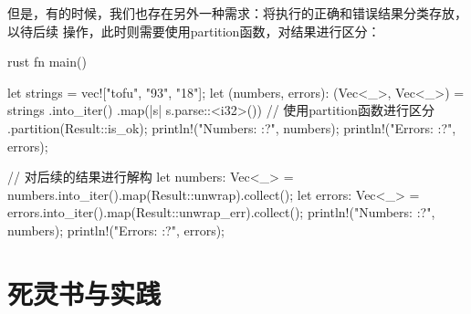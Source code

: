但是，有的时候，我们也存在另外一种需求：将执行的正确和错误结果分类存放，以待后续
操作，此时则需要使用partition函数，对结果进行区分：
\begin{code-block}{rust}
fn main() {
    let strings = vec!["tofu", "93", "18"];
    let (numbers, errors): (Vec<_>, Vec<_>) = strings
        .into_iter()
        .map(|s| s.parse::<i32>())
        // 使用partition函数进行区分
        .partition(Result::is_ok);
    println!("Numbers: {:?}", numbers);
    println!("Errors: {:?}", errors);

    // 对后续的结果进行解构
    let numbers: Vec<_> = numbers.into_iter().map(Result::unwrap).collect();
    let errors: Vec<_> = errors.into_iter().map(Result::unwrap_err).collect();
    println!("Numbers: {:?}", numbers);
    println!("Errors: {:?}", errors);
}
\end{code-block}

\section{死灵书与实践}

